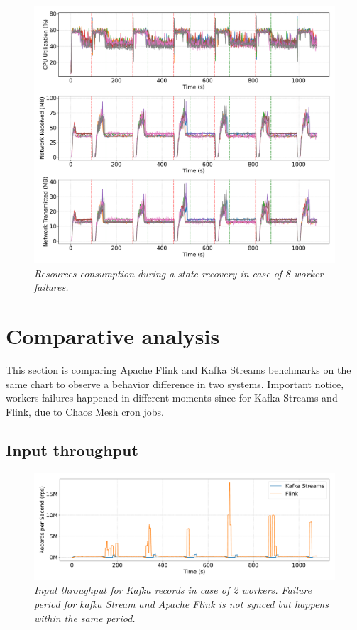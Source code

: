 \begin{figure}[H]
    \centering
    \includegraphics[width=1\textwidth]{figures/flink-8pods/flink_8_pods_resources}
    \caption{\textit{Resources consumption during a state recovery in case of 8 worker failures.}}
    \label{fig:flink-8pods-resource}
\end{figure}


\newpage
\section{Comparative analysis}\label{subsec:comparative-analysis}
This section is comparing Apache Flink and Kafka Streams benchmarks
on the same chart to observe a behavior difference in two systems.
Important notice, workers failures happened in different moments since
for Kafka Streams and Flink, due to Chaos Mesh cron jobs.

\subsection{Input throughput}\label{subsec:input-throughtput}

\begin{figure}[H]
    \centering
    \includegraphics[width=1\textwidth]{figures/kafka-flink/input-throughput-2pod-kafka-flink}
    \caption{\textit{Input throughput for Kafka records in case of 2 workers.
    Failure period for kafka Stream and Apache Flink is not synced but happens within the same period.}}
    \label{fig:kafka-flink-input-2}
\end{figure}


